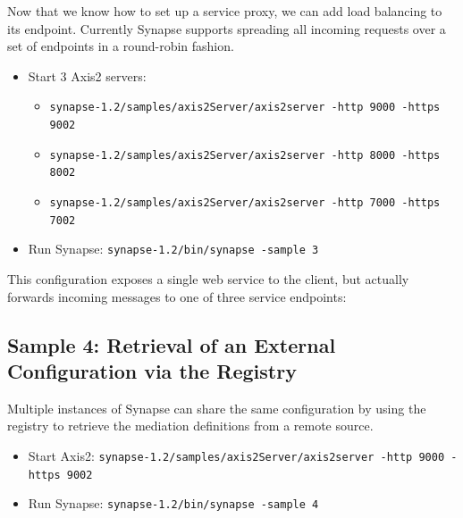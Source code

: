 Now that we know how to set up a service proxy, we can add load balancing to
its endpoint. Currently Synapse supports spreading all incoming requests over a
set of endpoints in a round-robin fashion.

\begin{itemize}
  \item Start 3 Axis2 servers:
  \begin{itemize}
    \item \texttt{synapse-1.2/samples/axis2Server/axis2server -http 9000 -https 9002}
    \item \texttt{synapse-1.2/samples/axis2Server/axis2server -http 8000 -https
    8002}
    \item \texttt{synapse-1.2/samples/axis2Server/axis2server -http 7000 -https
    7002}
  \end{itemize}
  \item Run Synapse: \texttt{synapse-1.2/bin/synapse -sample 3}
\end{itemize}

\lstset{caption=, label=sample-3-xml}


This configuration exposes a single web service to the client, but actually
forwards incoming messages to one of three service endpoints:


\newpage

\subsection{Sample 4: Retrieval of an External Configuration via the Registry}
\label{sec:sample-4}

Multiple instances of Synapse can share the same configuration by using
the registry to retrieve the mediation definitions from a remote source.

\begin{itemize}
  \item Start Axis2: \texttt{synapse-1.2/samples/axis2Server/axis2server -http
  9000 -https 9002}
  \item Run Synapse: \texttt{synapse-1.2/bin/synapse -sample 4}
\end{itemize}

\lstset{caption=, label=sample-4-xml}


